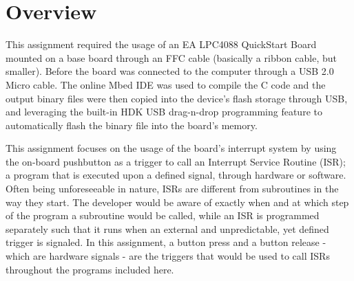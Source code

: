 \documentclass{article}
\begin{document}


\section*{Overview}
\justify
\large
This assignment required the usage of an EA LPC4088 QuickStart Board mounted on a base board through an FFC cable (basically a ribbon cable, but smaller). Before the board was connected to the computer through a USB 2.0 Micro cable. The online Mbed IDE was used to compile the C code and the output binary files were then copied into the device's flash storage through USB, and leveraging the built-in HDK USB drag-n-drop programming feature to automatically flash the binary file into the board's memory.

This assignment focuses on the usage of the board's interrupt system by using the on-board pushbutton as a trigger to call an Interrupt Service Routine (ISR); a program that is executed upon a defined signal, through hardware or software. Often being unforeseeable in nature, ISRs are different from subroutines in the way they start. The developer would be aware of exactly when and at which step of the program a subroutine would be called, while an ISR is programmed separately such that it runs when an external and unpredictable, yet defined trigger is signaled. In this assignment, a button press and a button release - which are hardware signals - are the triggers that would be used to call ISRs throughout the programs included here.\pagebreak
\end{document}
